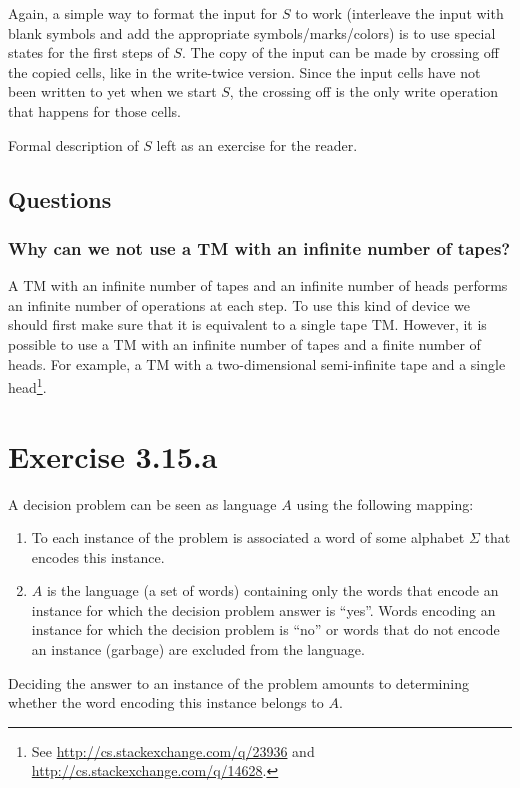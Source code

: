 \documentclass{article}
\newcommand{\0}{\texttt{\textvisiblespace}}
\newcommand{\°}{\obullet{\0}}
\newcommand{\TM}{TM}
\begin{document}
Again, a simple way to format the input for \(S\) to work
(interleave the input with blank symbols and add the
appropriate symbols/marks/colors) is to use special states for the
first steps of \(S\). The copy of the input can be made by crossing off the copied
cells, like in the write-twice version. Since the input cells have not been
written to yet when we start \(S\), the crossing off is the only write
operation that happens for those cells.

Formal description of $S$ left as an exercise for the reader.

\subsection{Questions}
\subsubsection{Why can we not use a \TM{} with an infinite number of
tapes?}
A \TM{} with an infinite number of tapes and an infinite number of heads
performs an infinite number of operations at each step.
To use this kind of device we should first make sure that it is equivalent to a single
tape \TM{}.
However, it is possible to use a \TM{} with an infinite number of tapes
and a finite number of heads. For example, a \TM{} with a two-dimensional
semi-infinite tape and a single head\footnote{See
\url{http://cs.stackexchange.com/q/23936}
and
\url{http://cs.stackexchange.com/q/14628}.}.

\section{Exercise 3.15.a}
A decision problem can be seen as language \(A\) using the following mapping:
\begin{enumerate}
	\item To each instance of the problem is associated a word of some alphabet
		\(\Sigma\) that encodes this instance.
	\item \(A\) is the language (a set of words) containing only
		the words that encode an instance for
		which the decision problem answer is ``yes''. Words encoding an
		instance for which the decision problem is ``no'' or words that do not
		encode an instance (garbage) are excluded from the language.
\end{enumerate}
Deciding the answer to an instance of the problem amounts to determining
whether the word encoding this instance belongs to \(A\).
\end{document}
